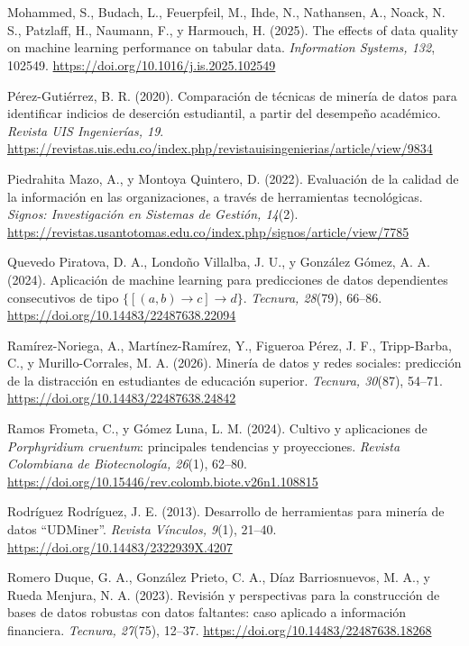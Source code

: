 \documentclass[11pt,openany,oneside,letterpaper]{book}
\makeatletter
\renewenvironment{thebibliography}[1]
  {\chapter*{\bibname}\addcontentsline{toc}{chapter}{\bibname}%
   \def\@biblabel##1{}\list{}{\usecounter{enumiv}\setlength{\leftmargin}{1.27cm}\setlength{\itemindent}{-1.27cm}%
   \setlength{\itemsep}{4pt}\setlength{\parsep}{0pt}}\sloppy}
  {\endlist}
\makeatother
\begin{document}
\begin{thebibliography}{xx}
 Mohammed, S., Budach, L., Feuerpfeil, M., Ihde, N., Nathansen, A., Noack, N. S., Patzlaff, H., Naumann, F., y Harmouch, H. (2025). The effects of data quality on machine learning performance on tabular data. \emph{Information Systems, 132}, 102549. \url{https://doi.org/10.1016/j.is.2025.102549}

 Pérez-Gutiérrez, B. R. (2020). Comparación de técnicas de minería de datos para identificar indicios de deserción estudiantil, a partir del desempeño académico. \emph{Revista UIS Ingenierías, 19}. \url{https://revistas.uis.edu.co/index.php/revistauisingenierias/article/view/9834}

 Piedrahita Mazo, A., y Montoya Quintero, D. (2022). Evaluación de la calidad de la información en las organizaciones, a través de herramientas tecnológicas. \emph{Signos: Investigación en Sistemas de Gestión, 14}(2). \url{https://revistas.usantotomas.edu.co/index.php/signos/article/view/7785}

 Quevedo Piratova, D. A., Londoño Villalba, J. U., y González Gómez, A. A. (2024). Aplicación de machine learning para predicciones de datos dependientes consecutivos de tipo $\{[(a, b)\rightarrow c]\rightarrow d\}$. \emph{Tecnura, 28}(79), 66--86. \url{https://doi.org/10.14483/22487638.22094}

 Ramírez-Noriega, A., Martínez-Ramírez, Y., Figueroa Pérez, J. F., Tripp-Barba, C., y Murillo-Corrales, M. A. (2026). Minería de datos y redes sociales: predicción de la distracción en estudiantes de educación superior. \emph{Tecnura, 30}(87), 54--71. \url{https://doi.org/10.14483/22487638.24842}

 Ramos Frometa, C., y Gómez Luna, L. M. (2024). Cultivo y aplicaciones de \emph{Porphyridium cruentum}: principales tendencias y proyecciones. \emph{Revista Colombiana de Biotecnología, 26}(1), 62--80. \url{https://doi.org/10.15446/rev.colomb.biote.v26n1.108815}

 Rodríguez Rodríguez, J. E. (2013). Desarrollo de herramientas para minería de datos ``UDMiner''. \emph{Revista Vínculos, 9}(1), 21--40. \url{https://doi.org/10.14483/2322939X.4207}

 Romero Duque, G. A., González Prieto, C. A., Díaz Barriosnuevos, M. A., y Rueda Menjura, N. A. (2023). Revisión y perspectivas para la construcción de bases de datos robustas con datos faltantes: caso aplicado a información financiera. \emph{Tecnura, 27}(75), 12--37. \url{https://doi.org/10.14483/22487638.18268}


\end{thebibliography}
\end{document}
